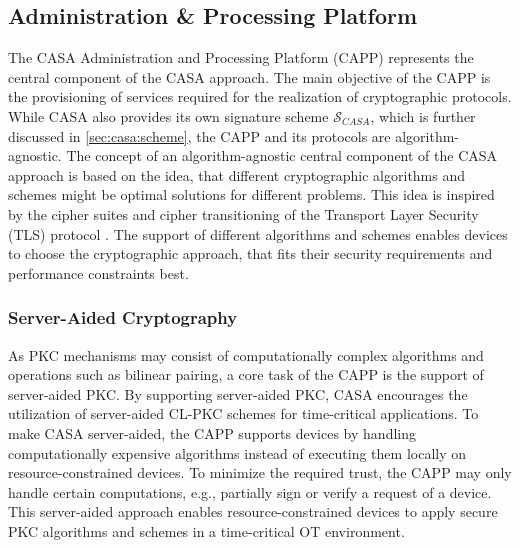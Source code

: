 
\subsection{Administration \& Processing Platform}
The CASA Administration and Processing Platform (CAPP) represents the central component of the CASA approach.
The main objective of the CAPP is the provisioning of services required for the realization of cryptographic protocols.
While CASA also provides its own signature scheme $\mathcal{S}_{CASA}$, which is further discussed in \autoref{sec:casa:scheme}, the CAPP and its protocols are algorithm-agnostic.
The concept of an algorithm-agnostic central component of the CASA approach is based on the idea, that different cryptographic algorithms and schemes might be optimal solutions for different problems.
This idea is inspired by the cipher suites and cipher transitioning of the Transport Layer Security (TLS) protocol \cite{rfc8446}.
The support of different algorithms and schemes enables devices to choose the cryptographic approach, that fits their security requirements and performance constraints best.

\subsubsection{Server-Aided Cryptography}
As PKC mechanisms may consist of computationally complex algorithms and operations such as bilinear pairing, a core task of the CAPP is the support of server-aided PKC.
By supporting server-aided PKC, CASA encourages the utilization of server-aided CL-PKC schemes for time-critical applications.
To make CASA server-aided, the CAPP supports devices by handling computationally expensive algorithms instead of executing them locally on resource-constrained devices.
To minimize the required trust, the CAPP may only handle certain computations, e.g., partially sign or verify a request of a device.
This server-aided approach enables resource-constrained devices to apply secure PKC algorithms and schemes in a time-critical OT environment.

